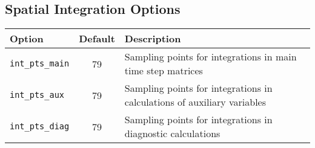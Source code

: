 \documentclass[letterpaper]{book}
\begin{document}
\subsection{Spatial Integration Options}
\begin{tabular}{lcp{3in}}
  \textbf{Option}&\textbf{Default}&\textbf{Description}\\
  \hline
  \texttt{int\_pts\_main}  & 79 & Sampling points for integrations in
                                main time step matrices\\
  \texttt{int\_pts\_aux}   & 79 & Sampling points for integrations in
                                calculations of auxiliary variables\\
  \texttt{int\_pts\_diag}  & 79 & Sampling points for integrations in
                                diagnostic calculations\\
\end{tabular}
\end{document}
